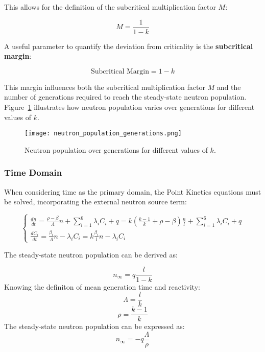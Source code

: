 This allows for the definition of the subcritical multiplication factor $ M $:

\begin{equation}
M = \frac{1}{1 - k}
\end{equation}

A useful parameter to quantify the deviation from criticality is the \textbf{subcritical margin}:

\begin{equation}
\text{Subcritical Margin} = 1 - k
\end{equation}

This margin influences both the subcritical multiplication factor $M$ and the number of generations required to reach the steady-state neutron population. Figure~\ref{fig:n_vs_gen} illustrates how neutron population varies over generations for different values of \( k \).

\begin{figure}[H]
    \centering
    \texttt{[image: neutron\_population\_generations.png]} %
    \caption{Neutron population over generations for different values of $ k $.}
    \label{fig:n_vs_gen}
\end{figure}

\subsubsection{Time Domain}

When considering time as the primary domain, the Point Kinetics equations must be solved, incorporating the external neutron source term:

\begin{equation}
    \begin{cases}
        \frac{dn}{dt} = \frac{\rho - \beta}{\Lambda} n + \sum\limits_{i=1}^{6} \lambda_i C_i + q 
        = k \left( \frac{k-1}{k} + \rho - \beta \right) \frac{n}{l} + \sum\limits_{i=1}^{6} \lambda_i C_i + q \\[10pt]
        
        \frac{dC_i}{dt} = \frac{\beta_i}{\Lambda} n - \lambda_i C_i 
        = k \frac{\beta_i}{l} n - \lambda_i C_i
    \end{cases}
\end{equation}
    
The steady-state neutron population can be derived as:

\begin{equation}
    n_{\infty} = q \frac{l}{1 - k}
\end{equation}
Knowing the definiton of mean generation time and reactivity:
\begin{equation}
    \Lambda =\frac{l}{k}
\end{equation}
\hspace{1cm}
\begin{equation}
    \rho = \frac{k-1}{k}
\end{equation}
The steady-state neutron population can be expressed as:
\begin{equation}
    n_{\infty} = - q\frac{\Lambda}{\rho}
\end{equation}

